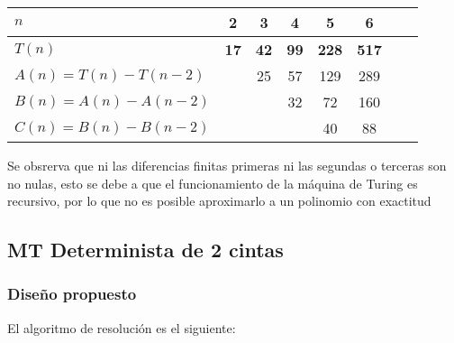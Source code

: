 \begin{table}[h]
    \centering
    \begin{tabular}{|l|c|c|c|c|c|c|c|}
        \hline
        $n$ & \textbf{2} & \textbf{3} & \textbf{4} & \textbf{5} & \textbf{6}\\ \hline
        $T(n)$ & \textbf{17} & \textbf{42} & \textbf{99} & \textbf{228} & \textbf{517}      \\ \hline
        \hline
        $A(n) = T(n) - T(n-2)$ &    & 25 & 57 & 129 & 289 \\ \hline
        $B(n) = A(n) - A(n-2)$ &    &   & 32 & 72 & 160 \\ \hline
        $C(n) = B(n) - B(n-2)$ &    &   &    & 40 & 88 \\ \hline
    \end{tabular}
\end{table}

Se obsrerva que ni las diferencias finitas primeras ni las segundas o terceras son no nulas, esto se debe a que el funcionamiento de la máquina de Turing es recursivo, por lo que no es posible aproximarlo a un polinomio con exactitud\\





\subsection{MT Determinista de 2 cintas}

\subsubsection*{Diseño propuesto}
El algoritmo de resolución es el siguiente:


